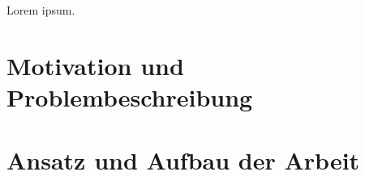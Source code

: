 \par{} Lorem ipsum.

\section{Motivation und Problembeschreibung}\label{lMotivationUndProblembeschreibung}

\section{Ansatz und Aufbau der Arbeit}\label{lAnsatzUndAufbau}
